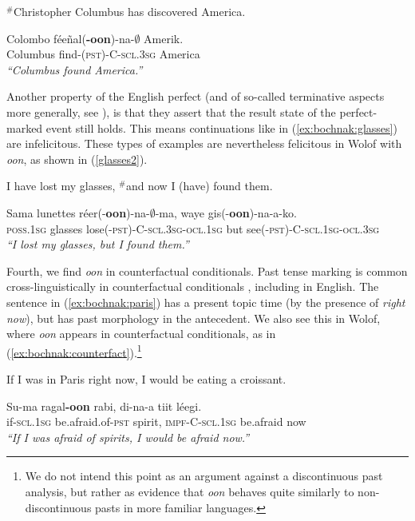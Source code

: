 \documentclass[output=paper]{langsci/langsci}
\begin{document}
\ea\label{columbus2}
$^{\#}$Christopher Columbus has discovered America.
\z

\ea\label{ex:bochnak:columbus}
\gll Colombo f\'ee\~nal(\textbf{-oon})-na-$\emptyset$ Amerik.\\
Columbus find-(\textsc{pst)-C-scl.3sg} America\\
\glt \textit{``Columbus found America.''}
\z

Another property of the English perfect (and of so-called terminative aspects more generally, see \citealt{bohnemeyer02grammar}), is that they assert that the result state of the perfect-marked event still holds. This means continuations like in (\ref{ex:bochnak:glasses}) are infelicitous. These types of examples are nevertheless felicitous in Wolof with \textit{oon}, as shown in (\ref{glasses2}).

\ea\label{ex:bochnak:glasses} 
I have lost my glasses, $^{\#}$and now I (have) found them. 
\z

\ea\label{glasses2}
\gll Sama lunettes r\'eer(-\textbf{oon})-na-$\emptyset$-ma, waye gis(-\textbf{oon})-na-a-ko. \\
\textsc{poss.1sg} glasses lose\textsc{(-pst)-C-scl.3sg-ocl.1sg} but see\textsc{(-pst)-C-scl.1sg-ocl.3sg} \\
\glt \textit{``I lost my glasses, but I found them.''} 
\z

Fourth, we find \textit{oon} in counterfactual conditionals. Past tense marking is common cross-linguistically in counterfactual conditionals \citep{iatridou00grammatical, halpert12aspect}, including in English. The sentence in (\ref{ex:bochnak:paris}) has a present topic time (by the presence of \textit{right now}), but has past morphology in the antecedent. We also see this in Wolof, where \textit{oon} appears in counterfactual conditionals, as in (\ref{ex:bochnak:counterfact}).\footnote{We do not intend this point as an argument against a discontinuous past analysis, but rather as evidence that \textit{oon} behaves quite similarly to non-discontinuous pasts in more familiar languages.}  

\ea\label{ex:bochnak:paris} 
If I was in Paris right now, I would be eating a croissant. 
\z

\ea\label{ex:bochnak:counterfact}
\gll Su-ma ragal\textbf{-oon} rabi, di-na-a tiit l\'eegi.\\
if-\textsc{scl.1sg} be.afraid.of-\textsc{pst} spirit,
\textsc{impf-C-scl.1sg} be.afraid now\\
\glt \textit{``If I was afraid of spirits, I would be afraid now.''}
\z
\end{document}
